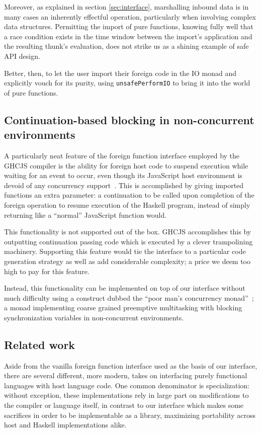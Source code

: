 \documentclass[preprint]{sigplanconf}
\begin{document}
Moreover, as explained in section \ref{sec:interface}, marshalling inbound
data is in many cases an inherently effectful operation, particularly when
involving complex data structures. Permitting the import of pure functions,
knowing fully well that a race condition exists in the time window between
the import's application and the resulting thunk's evaluation, does not strike
us as a shining example of safe API design.

Better, then, to let the user import their foreign code in the IO monad and
explicitly vouch for its purity, using \lstinline!unsafePerformIO! to bring it
into the world of pure functions.

\subsection{Continuation-based blocking in non-concurrent environments}
A particularly neat feature of the foreign function interface employed by the
GHCJS compiler is the ability for foreign host code to suspend execution while
waiting for an event to occur, even though its JavaScript host environment is
devoid of any concurrency support\ \cite{ghcjs}.
This is accomplished by giving imported functions an extra parameter:
a continuation to be called upon completion
of the foreign operation to resume execution of the Haskell program, instead
of simply returning like a ``normal'' JavaScript function would.

This functionality is not supported out of the box. GHCJS accomplishes this
by outputting continuation passing code which is executed by a clever
trampolining machinery. Supporting this feature would tie the interface to
a particular code generation strategy as well as add considerable complexity;
a price we deem too high to pay for this feature.

Instead, this functionality can be implemented on top of our interface without
much difficulty using a construct dubbed the ``poor man's concurrency
monad''\ \cite{poormansconcurrencymonad}; a monad implementing coarse grained
preemptive multitasking with blocking synchronization variables in
non-concurrent environments.

\subsection{Related work}\label{sec:related}
Aside from the vanilla foreign function interface used as the basis of our
interface, there are several different, more modern, takes on interfacing
purely functional languages with host language code.
One common denominator is specialization: without exception, these
implementations rely in large part on modifications to the compiler or
language itself, in contrast to our interface which makes some sacrifices
in order to be implementable as a library, maximizing portability across
host and Haskell implementations alike.
\end{document}
